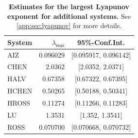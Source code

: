 \documentclass{article}
\begin{document}
\begin{table}[b!]
\begin{center}
\fontsize{8.0pt}{10pt}\selectfont
{}\selectfont
\renewcommand{\arraystretch}{1.05}
\setlength{\tabcolsep}{0.5em}
\begin{tabular}{lrc}
\toprule
System & $\lambda_{\mathsf{max}}$ & 95\%-Conf.Int. \\ 
\midrule\addlinespace[2.5pt]
AIZ & 0.096029 & [0.095917, 0.096142] \\ 
CHEN & 2.0362 & [2.0352, 2.0371] \\ 
HALV & 0.67358 & [0.67322, 0.67395] \\ 
HCHEN & 0.50265 & [0.50188, 0.50341] \\ 
HROSS & 0.11274 & [0.11266, 0.11283] \\ 
LU & 1.3531 & [1.352, 1.3541] \\ 
ROSS & 0.070700 & [0.070668, 0.070732] \\ 
\bottomrule
\end{tabular}
\end{center}


    \caption{\textbf{Estimates for the largest Lyapunov exponent for additional systems.} See \cref{app:sec:lyapunov} for more details.}
    \label{tbl:add:lyapunov}
\end{table}
\end{document}
